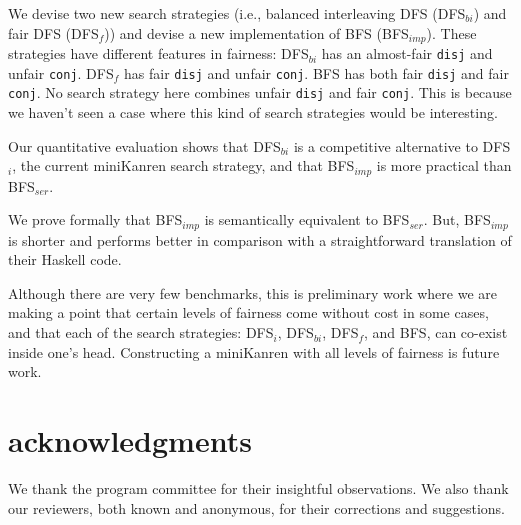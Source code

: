 \documentclass[acmlarge, review=true]{acmart}
\newcommand{\conj}{\texttt{conj}}
\newcommand{\disj}{\texttt{disj}}
\newcommand{\DFSi }[0]{DFS$_{i}$}
\newcommand{\DFSf }[0]{DFS$_{f}$}
\newcommand{\DFSbi}[0]{DFS$_{bi}$}
\newcommand{\BFS}[0]{BFS}
\newcommand{\BFSser}[0]{BFS$_{ser}$}
\newcommand{\BFSimp}[0]{BFS$_{imp}$}
\begin{document}
We devise two new search strategies (i.e., balanced interleaving DFS 
(\DFSbi{}) and fair DFS (\DFSf{})) and devise a new 
implementation of \BFS{} (\BFSimp{}). These strategies have different features 
in fairness: \DFSbi{} has an almost-fair \disj{} and unfair \conj{}. 
\DFSf{} has fair \disj{} and unfair \conj{}. \BFS{} has both fair
\disj{} and fair \conj{}. No search strategy here combines unfair 
\disj{} and fair \conj{}. This is because we haven't seen a case where this 
kind of search strategies would be interesting.

Our quantitative evaluation shows that \DFSbi{} is a competitive 
alternative to \DFSi{}, the current miniKanren search strategy,
and that \BFSimp{} is more practical than \BFSser{}.

We prove formally that \BFSimp{} is semantically equivalent to \BFSser{}. But, 
\BFSimp{} is shorter and performs better in comparison with a straightforward 
translation of their Haskell code.

Although there are very few benchmarks, this is preliminary work where we are 
making a point that certain levels of fairness come without cost in some cases, 
and that each of the search strategies: \DFSi, \DFSbi, \DFSf, and 
\BFS, can co-exist inside one's head. Constructing a miniKanren with all 
levels of fairness is future work.

\section*{acknowledgments}

We thank the program committee for their insightful observations. We also thank 
our reviewers, both known and anonymous, for their corrections and suggestions.



\end{document}

